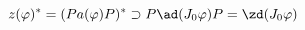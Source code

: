 \begin{equation*}
  z(\varphi)^* = (Pa(\varphi)P)^* \supset P \ad(J_0\varphi)P = \zd(J_0\varphi)
\end{equation*}

